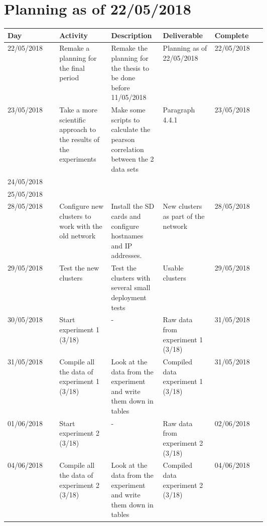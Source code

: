 \section*{Planning as of 22/05/2018}
\begin{longtable}{| l | p{0.2\linewidth}| p{0.2\linewidth} | p{0.2\linewidth} | l |}
\hline
Day & Activity & Description & Deliverable & Complete \\ 
\hline

22/05/2018 & Remake a planning for the final period &  Remake the planning for the thesis to be done before 11/05/2018 & Planning as of 22/05/2018 & 22/05/2018 \\
\hline

23/05/2018 & Take a more scientific approach to the results of the experiments & Make some scripts to calculate the pearson correlation between the 2 data sets & Paragraph 4.4.1 & 23/05/2018 \\
\hline

24/05/2018 & &&& \\
\hline

25/05/2018 & &&& \\
\hline

28/05/2018 & Configure new clusters to work with the old network & Install the SD cards and configure hostnames and IP addresses. & New clusters as part of the network & 28/05/2018 \\
\hline

29/05/2018 & Test the new clusters & Test the clusters with several small deployment tests & Usable clusters & 29/05/2018 \\
\hline

30/05/2018 & Start experiment 1 (3/18) & - & Raw data from experiment 1 (3/18) & 31/05/2018 \\
\hline

31/05/2018 & Compile all the data of experiment 1 (3/18) & Look at the data from the experiment and write them down in tables & Compiled data experiment 1 (3/18) & 31/05/2018 \\
\hline

01/06/2018 & Start experiment 2 (3/18) & - & Raw data from experiment 2 (3/18) & 02/06/2018 \\
\hline

04/06/2018 & Compile all the data of experiment 2 (3/18) & Look at the data from the experiment and write them down in tables & Compiled data experiment 2 (3/18) & 04/06/2018 \\
\hline


\end{longtable}
